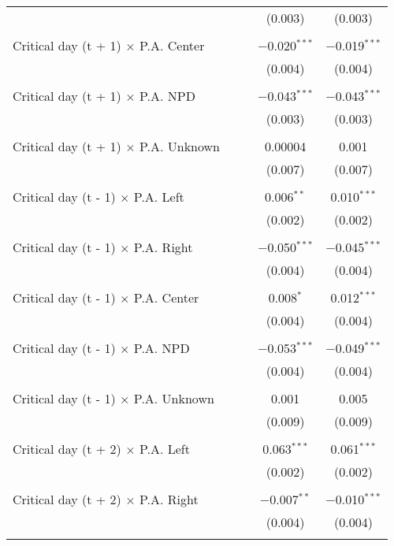\documentclass[
]{article}
\begin{document}
\begin{table}[!htbp]
{\begin{tabular}{@{\extracolsep{5pt}}lcccc}
  &  &  & (0.003) & (0.003) \\ 
  & & & & \\ 
 Critical day (t + 1) $\times$ P.A. Center &  &  & $-$0.020$^{***}$ & $-$0.019$^{***}$ \\ 
  &  &  & (0.004) & (0.004) \\ 
  & & & & \\ 
 Critical day (t + 1) $\times$ P.A. NPD &  &  & $-$0.043$^{***}$ & $-$0.043$^{***}$ \\ 
  &  &  & (0.003) & (0.003) \\ 
  & & & & \\ 
 Critical day (t + 1) $\times$ P.A. Unknown &  &  & 0.00004 & 0.001 \\ 
  &  &  & (0.007) & (0.007) \\ 
  & & & & \\ 
 Critical day (t - 1) $\times$ P.A. Left &  &  & 0.006$^{**}$ & 0.010$^{***}$ \\ 
  &  &  & (0.002) & (0.002) \\ 
  & & & & \\ 
 Critical day (t - 1) $\times$ P.A. Right &  &  & $-$0.050$^{***}$ & $-$0.045$^{***}$ \\ 
  &  &  & (0.004) & (0.004) \\ 
  & & & & \\ 
 Critical day (t - 1) $\times$ P.A. Center &  &  & 0.008$^{*}$ & 0.012$^{***}$ \\ 
  &  &  & (0.004) & (0.004) \\ 
  & & & & \\ 
 Critical day (t - 1) $\times$ P.A. NPD &  &  & $-$0.053$^{***}$ & $-$0.049$^{***}$ \\ 
  &  &  & (0.004) & (0.004) \\ 
  & & & & \\ 
 Critical day (t - 1) $\times$ P.A. Unknown &  &  & 0.001 & 0.005 \\ 
  &  &  & (0.009) & (0.009) \\ 
  & & & & \\ 
 Critical day (t + 2) $\times$ P.A. Left &  &  & 0.063$^{***}$ & 0.061$^{***}$ \\ 
  &  &  & (0.002) & (0.002) \\ 
  & & & & \\ 
 Critical day (t + 2) $\times$ P.A. Right &  &  & $-$0.007$^{**}$ & $-$0.010$^{***}$ \\ 
  &  &  & (0.004) & (0.004) \\ 
  & & & & \\ 

\end{tabular}}
\end{table}
\end{document}

